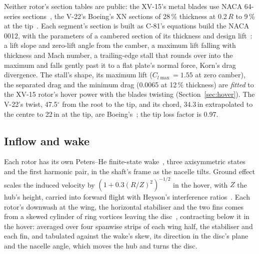 \documentclass[10pt,a4paper,twocolumn]{article}
\begin{document}
Neither rotor's section tables are public: the XV-15's metal blades use NACA 64-series sections~\cite{fb}, the V-22's Boeing's XN
sections of 28\,\% thickness at 0.2\,$R$ to 9\,\% at the tip~\cite{rc,wj}. Each segment's section is built as C-81's equations build
the NACA 0012, with the parameters of a cambered section of its thickness and design lift~\cite{nacar}: a lift slope and zero-lift angle
from the camber, a maximum lift falling with thickness and Mach number, a trailing-edge stall that rounds over into the maximum and falls
gently past it to a flat plate's normal force, Korn's drag divergence. The stall's shape, its maximum lift ($C_{l\max}=1.55$ at
zero camber), the separated drag and the minimum drag (0.0065 at 12\,\% thickness) are \emph{fitted} to the XV-15 rotor's hover power with
the blades twisting (Section~\ref{sec:hover}). The
V-22's twist, 47.5$^\circ$ from the root to the tip, and its chord, 34.3\,in extrapolated to the centre to 22\,in at the tip, are
Boeing's~\cite{rc,wj}; the tip loss factor is 0.97.

\subsection{Inflow and wake}
Each rotor has its own Peters--He finite-state wake~\cite{ph,metu}, three axisymmetric states and the first harmonic pair, in the shaft's
frame as the nacelle tilts. Ground effect scales the induced velocity by $(1+0.3(R/Z)^2)^{-1/2}$ in the hover, with $Z$ the hub's
height, carried into forward flight with Heyson's interference ratios~\cite{heyson}. Each rotor's downwash at the wing, the horizontal
stabiliser and the two fins comes from a skewed cylinder of ring vortices leaving the disc~\cite{hk}, contracting below it in the
hover: averaged over four spanwise strips of each wing half, the stabiliser and each fin, and tabulated against the wake's skew,
its direction in the disc's plane and the nacelle angle, which moves the hub and turns the disc.
\end{document}

